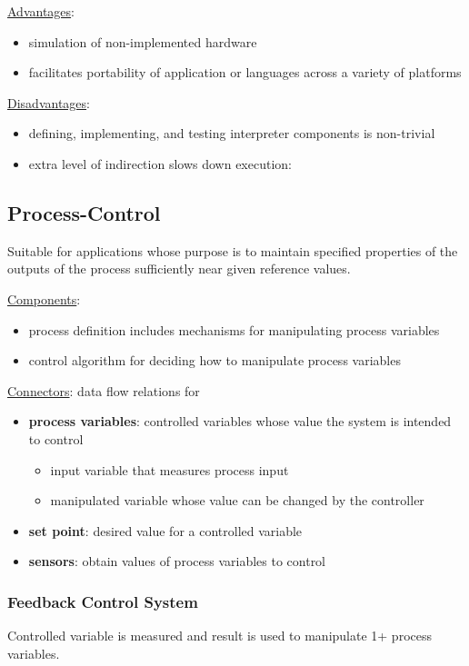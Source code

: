 \documentclass[11pt]{article}
\begin{document}
\uline{Advantages}:
\begin{itemize}
\item simulation of non-implemented hardware
\item facilitates portability of application or languages across
a variety of platforms
\end{itemize}

\uline{Disadvantages}:
\begin{itemize}
\item defining, implementing, and testing interpreter components
is non-trivial
\item extra level of indirection slows down execution:
\end{itemize}
\subsection{Process-Control}
\label{sec:orga12ed3d}
Suitable for applications whose purpose is to maintain
specified properties of the outputs of the process sufficiently
near given reference values.

\uline{Components}:
\begin{itemize}
\item process definition includes mechanisms for manipulating process
variables
\item control algorithm for deciding how to manipulate process
variables
\end{itemize}

\uline{Connectors}: data flow relations for
\begin{itemize}
\item \textbf{process variables}: controlled variables whose value the system
is intended to control
\begin{itemize}
\item input variable that measures process input
\item manipulated variable whose value can be changed by the controller
\end{itemize}
\item \textbf{set point}: desired value for a controlled variable
\item \textbf{sensors}: obtain values of process variables to control
\end{itemize}
\subsubsection{Feedback Control System}
\label{sec:orgb56781e}
Controlled variable is measured and result is used to manipulate
1+ process variables.
\end{document}
